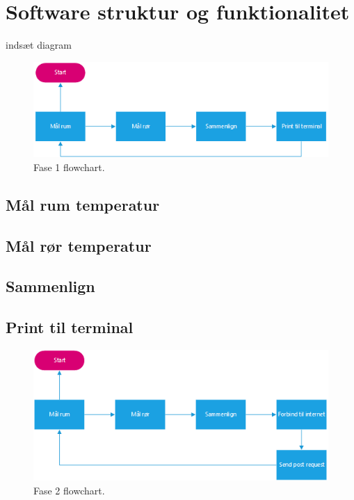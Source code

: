 \section{Software struktur og funktionalitet}
indsæt diagram
\begin{figure}[h!]
  \caption{Fase 1 flowchart.}
  \centering
  \includegraphics[width=1\textwidth]{figures/Fase1software.png}
\end{figure}



\subsection{Mål rum temperatur}

\subsection{Mål rør temperatur}

\subsection{Sammenlign}

\subsection{Print til terminal}

\begin{figure}[h!]
  \caption{Fase 2 flowchart.}
  \centering
  \includegraphics[width=1\textwidth]{figures/Fase2software.png}
\end{figure}